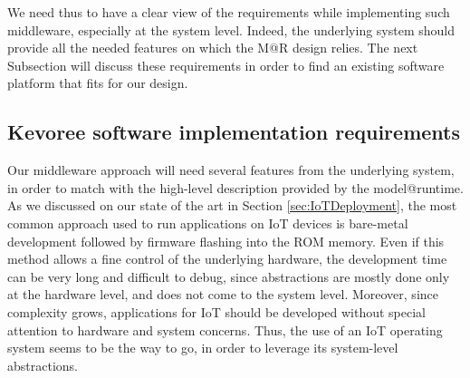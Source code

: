 We need thus to have a clear view of the requirements while implementing such middleware, especially at the system level.
Indeed, the underlying system should provide all the needed features on which the M@R design relies.
The next Subsection will discuss these requirements in order to find an existing software platform that fits for our design.

\subsection{Kevoree software implementation requirements}
\label{sec:kevoreeRequirements}
Our middleware approach will need several features from the underlying system, in order to match with the high-level description provided by the model@runtime.
As we discussed on our state of the art in Section \ref{sec:IoTDeployment}, the most common approach used to run applications on IoT devices is bare-metal development followed by firmware flashing into the ROM memory.
Even if this method allows a fine control of the underlying hardware, the development time can be very long and difficult to debug, since abstractions are mostly done only at the hardware level, and does not come to the system level.
Moreover, since complexity grows, applications for IoT should be developed without special attention to hardware and system concerns.
Thus, the use of an IoT operating system seems to be the way to go, in order to leverage its system-level abstractions.

